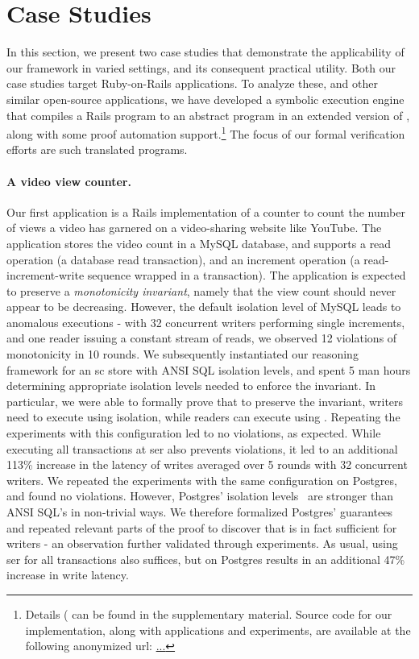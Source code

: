 \section{Case Studies}
\label{sec:case-studies}

In this section, we present two case studies that demonstrate the
applicability of our framework in varied settings, and its consequent
practical utility. Both our case studies target Ruby-on-Rails
applications. To analyze these, and other similar open-source
applications, we have developed a symbolic execution engine that
compiles a Rails program to an abstract program in an extended version
of \txnimp, along with some proof automation support.\footnote{Details
  ( can be found in the supplementary material.  Source code for our
  implementation, along with applications and experiments, are
  available at the following anonymized url: \url{...}} The focus of
our formal verification efforts are such translated \txnimp programs.

\paragraph{A video view counter.} Our first application is a Rails
implementation of a counter to count the number of views a video has
garnered on a video-sharing website like YouTube. The application
stores the video count in a MySQL database, and supports a read
operation (a database read transaction), and an increment operation (a
read-increment-write sequence wrapped in a transaction).  The
application is expected to preserve a \emph{monotonicity invariant},
namely that the view count should never appear to be decreasing.
However, the default  isolation level of MySQL
leads to anomalous executions - with 32 concurrent writers performing
single increments, and one reader issuing a constant stream of reads,
we observed 12 violations of monotonicity in 10 rounds. We
subsequently instantiated our reasoning framework for an {\sc sc}
store with ANSI SQL isolation levels, and spent 5 man hours
determining appropriate isolation levels needed to enforce the
invariant. In particular, we were able to formally prove that to
preserve the invariant, writers need to execute using
 isolation, while readers can execute using
. Repeating the experiments with this
configuration led to no violations, as expected. While executing all
transactions at {\sc ser} also prevents violations, it led to an
additional 113\% increase in the latency of writes averaged over 5
rounds with 32 concurrent writers.  We repeated the experiments with
the same configuration on Postgres, and found no violations. However,
Postgres' isolation levels~\cite{postgresiso} are stronger than ANSI
SQL's in non-trivial ways. We therefore formalized Postgres'
guarantees and repeated relevant parts of the proof to discover that
 is in fact sufficient for writers - an
observation further validated through experiments. As usual, using
{\sc ser} for all transactions also suffices, but on Postgres results
in an additional 47\% increase in write latency.

